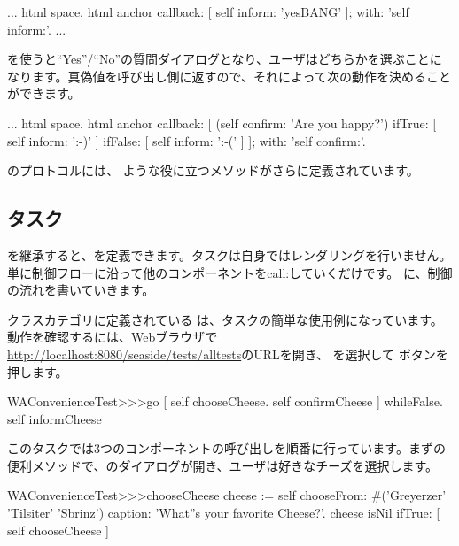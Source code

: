 \documentclass[a4paper,10pt,twoside]{book}
\begin{document}
\begin{code}{}
...
	html space.
	html anchor
		callback: [ self inform: 'yesBANG' ];
		with: 'self inform:'.
...
\end{code}

 を使うと``Yes''/``No''の質問ダイアログとなり、ユーザはどちらかを選ぶことになります。真偽値を呼び出し側に返すので、それによって次の動作を決めることができます。

\begin{code}{}
...
	html space.
	html anchor
		callback: [
			(self confirm: 'Are you happy?')
				ifTrue: [ self inform: ':-)' ]
				ifFalse: [ self inform: ':-(' ]
			];
		with: 'self confirm:'.
\end{code}

のプロトコルには、 ような役に立つメソッドがさらに定義されています。

\subsection{タスク}

 を継承すると、を定義できます。タスクは自身ではレンダリングを行いません。単に制御フローに沿って他のコンポーネントをcall:していくだけです。 に、制御の流れを書いていきます。

クラスカテゴリに定義されている は、タスクの簡単な使用例になっています。動作を確認するには、Webブラウザで \url{http://localhost:8080/seaside/tests/alltests}のURLを開き、  を選択して ボタンを押します。


\begin{code}{}
WAConvenienceTest>>>go
	[ self chooseCheese.
	  self confirmCheese ] whileFalse.
	self informCheese
\end{code}

このタスクでは3つのコンポーネントの呼び出しを順番に行っています。まずの便利メソッドで、のダイアログが開き、ユーザは好きなチーズを選択します。

\begin{code}{}
WAConvenienceTest>>>chooseCheese
	cheese := self
		chooseFrom: #('Greyerzer' 'Tilsiter' 'Sbrinz')
		caption: 'What''s your favorite Cheese?'.
	cheese isNil ifTrue: [ self chooseCheese ]
\end{code}
\end{document}

